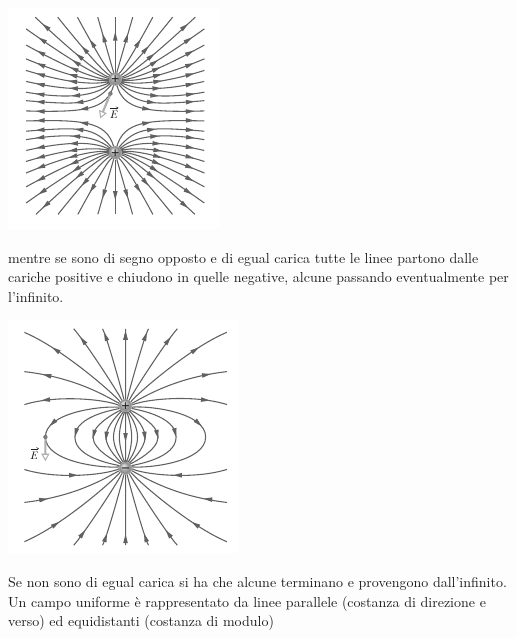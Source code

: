 \documentclass[a4paper,12pt, oneside]{book}
\begin{document}
\begin{center}
\includegraphics[scale=0.7]{img/ele2.png}
\end{center}
mentre se sono di segno opposto e di egual carica tutte le linee partono dalle cariche positive e chiudono in quelle negative, alcune passando eventualmente per l'infinito.
\begin{center}
\includegraphics[scale=0.7]{img/ele3.png}
\end{center}
Se non sono di egual carica si ha che alcune terminano e provengono dall'infinito.\\
Un campo uniforme è rappresentato da linee parallele (costanza di direzione e verso) ed equidistanti (costanza di modulo)
\newpage
\end{document}

